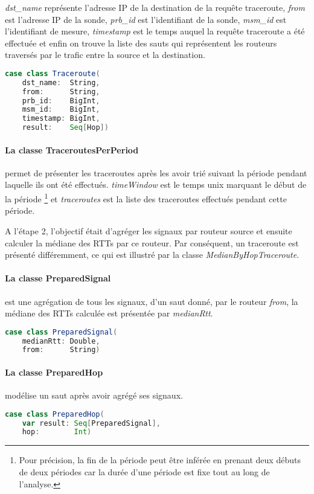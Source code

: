 \textit{dst\_name} représente l'adresse IP de la destination de la requête traceroute, \textit{from} est l'adresse IP de la sonde, \textit{prb\_id} est l'identifiant de la sonde, \textit{msm\_id} est l'identifiant de mesure, \textit{timestamp} est le temps auquel la requête traceroute a été effectuée et enfin on trouve la liste des sauts qui représentent les routeurs traversés par le trafic entre la source et la destination. 

\begin{lstlisting}[language=scala, caption={La classe Traceroute en Scala }]
case class Traceroute(
	dst_name:  String,
	from:      String,
	prb_id:    BigInt,
	msm_id:    BigInt,
	timestamp: BigInt,
	result:    Seq[Hop])
\end{lstlisting}
\paragraph{La classe TraceroutesPerPeriod} permet de présenter les traceroutes après les avoir trié   suivant la période pendant laquelle ils ont été effectués.   \textit{timeWindow} est le temps unix marquant le début de la période \footnote{Pour précision, la fin de la période peut être inférée en prenant deux débuts de deux périodes car la durée d'une période est fixe tout au long de l'analyse.} et  \textit{traceroutes} est la liste des traceroutes effectués pendant cette période. 


A l'étape 2, l'objectif était d'agréger  les signaux par routeur source et ensuite calculer la médiane des RTTs par ce routeur. Par conséquent, un traceroute est présenté différemment, ce qui est  illustré par la classe \textit{MedianByHopTraceroute}.

\paragraph{La classe PreparedSignal }  est une agrégation de tous les signaux, d'un saut donné, par le routeur \textit{from},  la médiane des RTTs calculée est présentée par \textit{medianRtt}.
\begin{lstlisting}[language=scala, caption={La classe PreparedSignal en Scala }]
case class PreparedSignal(
	medianRtt: Double,
	from:      String)
\end{lstlisting}
\paragraph{La classe PreparedHop } modélise un saut après avoir agrégé ses signaux. 
\begin{lstlisting}[language=scala, caption={La classe PreparedHop en Scala }]
case class PreparedHop(
	var result: Seq[PreparedSignal],
	hop:        Int)
\end{lstlisting}


